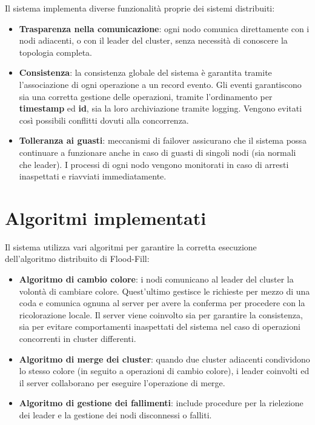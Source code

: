\documentclass[12pt, a4paper]{report}
\begin{document}
Il sistema implementa diverse funzionalit\`a proprie dei sistemi distribuiti:
\begin{itemize}
    \item \textbf{Trasparenza nella comunicazione}: ogni nodo comunica direttamente con i nodi adiacenti, o con il leader del cluster, senza necessit\`a di conoscere la topologia completa.
    \item \textbf{Consistenza}: la consistenza globale del sistema \`e garantita tramite l'associazione di ogni operazione a un record evento. Gli eventi garantiscono sia una corretta gestione delle operazioni, tramite l'ordinamento per \textbf{timestamp} ed \textbf{id}, sia la loro archiviazione tramite logging. Vengono evitati cos\`i possibili conflitti dovuti alla concorrenza.
    \item \textbf{Tolleranza ai guasti}: meccanismi di failover assicurano che il sistema possa continuare a funzionare anche in caso di guasti di singoli nodi (sia normali che leader). I processi di ogni nodo vengono monitorati in caso di arresti inaspettati e riavviati immediatamente.
\end{itemize}

\section{Algoritmi implementati}

Il sistema utilizza vari algoritmi per garantire la corretta esecuzione dell'algoritmo distribuito di Flood-Fill:
\begin{itemize}
    \item \textbf{Algoritmo di cambio colore}: i nodi comunicano al leader del cluster la volont\`a di cambiare colore. Quest'ultimo gestisce le richieste per mezzo di una coda e comunica ognuna al server per avere la conferma per procedere con la ricolorazione locale. Il server viene coinvolto sia per garantire la consistenza, sia per evitare comportamenti inaspettati del sistema nel caso di operazioni concorrenti in cluster differenti.
    \item \textbf{Algoritmo di merge dei cluster}: quando due cluster adiacenti condividono lo stesso colore (in seguito a operazioni di cambio colore), i leader coinvolti ed il server collaborano per eseguire l'operazione di merge.
    \item \textbf{Algoritmo di gestione dei fallimenti}: include procedure per la rielezione dei leader e la gestione dei nodi disconnessi o falliti.
\end{itemize}
\end{document}
